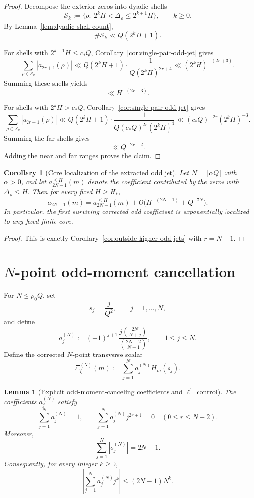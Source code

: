 \documentclass[11pt,a4paper]{amsart}
\theoremstyle{plain}
\newtheorem{lemma}[theorem]{Lemma}
\newtheorem{corollary}[theorem]{Corollary}
\theoremstyle{definition}
\begin{document}
\begin{proof}
Decompose the exterior zeros into dyadic shells
\[
\mathcal S_k:=\{\rho:\ 2^kH<\Delta_\rho\le 2^{k+1}H\},
\qquad k\ge 0.
\]
By Lemma~\ref{lem:dyadic-shell-count},
\[
\#\mathcal S_k\ll Q(2^kH+1).
\]

For shells with $2^{k+1}H\le c_*Q$, Corollary~\ref{cor:single-pair-odd-jet}
gives
\[
\sum_{\rho\in\mathcal S_k}|a_{2r+1}(\rho)|
\ll
Q(2^kH+1)\cdot \frac{1}{Q(2^kH)^{2r+4}}
\ll
(2^kH)^{-(2r+3)}.
\]
Summing these shells yields
\[
\ll H^{-(2r+3)}.
\]

For shells with $2^kH>c_*Q$, Corollary~\ref{cor:single-pair-odd-jet} gives
\[
\sum_{\rho\in\mathcal S_k}|a_{2r+1}(\rho)|
\ll
Q(2^kH+1)\cdot \frac{1}{Q(c_*Q)^{2r}(2^kH)^4}
\ll
(c_*Q)^{-2r}(2^kH)^{-3}.
\]
Summing the far shells gives
\[
\ll
Q^{-2r-2}.
\]
Adding the near and far ranges proves the claim.
\end{proof}

\begin{corollary}[Core localization of the extracted odd jet]
\label{cor:extracted-odd-jet-core-localization}
Let $N=\lfloor \alpha Q\rfloor$ with $\alpha>0$, and let
$a_{2N-1}^{\le H}(m)$ denote the coefficient contributed by the zeros with
$\Delta_\rho\le H$. Then for every fixed $H\ge H_*$,
\[
\boxed{
a_{2N-1}(m)
=
a_{2N-1}^{\le H}(m)
+
O\!\bigl(H^{-(2N+1)}+Q^{-2N}\bigr).
}
\]
In particular, the first surviving corrected odd coefficient is exponentially
localized to any fixed finite core.
\end{corollary}

\begin{proof}
This is exactly Corollary~\ref{cor:outside-higher-odd-jets} with $r=N-1$.
\end{proof}

\section{\texorpdfstring{$N$}{N}-point odd-moment cancellation}

For $N\le \rho_0Q$, set
\[
s_j=\frac{j}{Q^2},
\qquad j=1,\dots,N,
\]
and define
\[
a_j^{(N)}
:=
(-1)^{j+1}\,
\frac{j\binom{2N}{N+j}}{\binom{2N-2}{N-1}},
\qquad 1\le j\le N.
\]
Define the corrected $N$-point transverse scalar
\begin{equation}\label{eq:Xi-zeta}
\Xi_\zeta^{(N)}(m):=
\sum_{j=1}^N a_j^{(N)}H_m(s_j).
\end{equation}

\begin{lemma}[Explicit odd-moment-canceling coefficients and $\ell^1$ control]
\label{lem:n-point-coefficients}
The coefficients $a_j^{(N)}$ satisfy
\[
\sum_{j=1}^N a_j^{(N)}=1,
\qquad
\sum_{j=1}^N a_j^{(N)}j^{2r+1}=0
\quad (0\le r\le N-2).
\]
Moreover,
\[
\sum_{j=1}^N |a_j^{(N)}|=2N-1.
\]
Consequently, for every integer $k\ge 0$,
\[
\left|\sum_{j=1}^N a_j^{(N)}j^k\right|
\le
(2N-1)N^k.
\]
\end{lemma}
\end{document}
